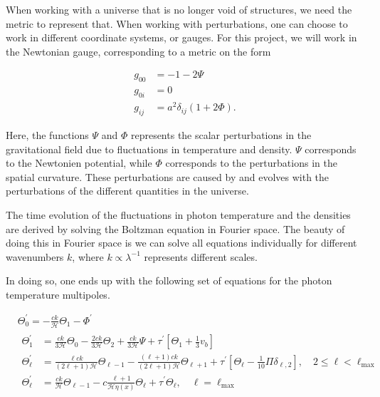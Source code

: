 \documentclass[12pt]{article}
\begin{document}
When working with a universe that is no longer void of structures, we need the metric to represent that. When working with perturbations, one can choose to work in different coordinate systems, or gauges. For this project, we will work in the Newtonian gauge, corresponding to a metric on the form

\begin{align}\label{eq:perturbed metric}
    g_{00} &= -1-2\Psi \nonumber \\
    g_{0i} &= 0 \\
    g_{ij} &= a^2\delta_{ij} (1+2\Phi) \nonumber.
\end{align}

Here, the functions $\Psi$ and $\Phi$ represents the scalar perturbations in the gravitational field due to fluctuations in temperature and density. $\Psi$ corresponds to the Newtonien potential, while $\Phi$ corresponds to the perturbations in the spatial curvature. These perturbations are caused by and evolves with the perturbations of the different quantities in the universe. 

The time evolution of the fluctuations in photon temperature and the densities are derived by solving the Boltzman equation in Fourier space. The beauty of doing this in Fourier space is we can solve all equations individually for different wavenumbers $k$, where $k\propto\lambda^{-1}$ represents different scales. 


In doing so, one ends up with the following set of equations for the photon temperature multipoles.


\begin{equation}\begin{aligned}\label{eq: photon multipoles dx}
    &\Theta_{0}^{\prime}=-\frac{c k}{\mathcal{H}} \Theta_{1}-\Phi^{\prime}\\
    &\begin{aligned}
    \Theta_{1}^{\prime} &=\frac{c k}{3 \mathcal{H}} \Theta_{0}-\frac{2 c k}{3 \mathcal{H}} \Theta_{2}+\frac{c k}{3 \mathcal{H}} \Psi+\tau^{\prime}\left[\Theta_{1}+\frac{1}{3} v_{b}\right] \\
    \Theta_{\ell}^{\prime} &=\frac{\ell c k}{(2 \ell+1) \mathcal{H}} \Theta_{\ell-1}-\frac{(\ell+1) c k}{(2 \ell+1) \mathcal{H}} \Theta_{\ell+1}+\tau^{\prime}\left[\Theta_{\ell}-\frac{1}{10} \Pi \delta_{\ell, 2}\right], \quad 2 \leq \ell<\ell_{\max } \\
    \Theta_{\ell}^{\prime} &=\frac{c k}{\mathcal{H}} \Theta_{\ell-1}-c \frac{\ell+1}{\mathcal{H} \eta(x)} \Theta_{\ell}+\tau^{\prime} \Theta_{\ell}, \quad \ell=\ell_{\max }
    \end{aligned}
    \end{aligned}\end{equation}
\end{document}
